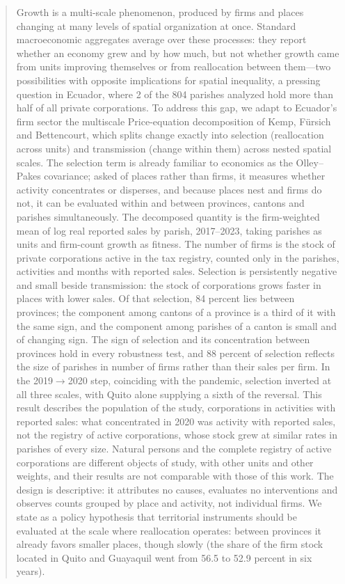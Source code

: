 \documentclass[conference]{IEEEtran}
\begin{document}
\begin{abstract}
Growth is a multi-scale phenomenon, produced by firms and places changing
at many levels of spatial organization at once. Standard macroeconomic
aggregates average over these processes: they report whether an economy
grew and by how much, but not whether growth came from units improving
themselves or from reallocation between them---two possibilities with
opposite implications for spatial inequality, a pressing question in
Ecuador, where 2 of the 804 parishes analyzed hold more than half of all
private corporations. To address this gap, we adapt to Ecuador's firm
sector the multiscale Price-equation decomposition of Kemp, F\"ursich and
Bettencourt, which splits change exactly into selection (reallocation
across units) and transmission (change within them) across nested spatial
scales. The selection term is already familiar to economics as the
Olley--Pakes covariance; asked of places rather than firms, it measures
whether activity concentrates or disperses, and because places nest and
firms do not, it can be evaluated within and between provinces, cantons
and parishes simultaneously. The decomposed quantity is the firm-weighted
mean of log real reported sales by parish, 2017--2023, taking parishes as
units and firm-count growth as fitness. The number of firms is the stock
of private corporations active in the tax registry, counted only in the
parishes, activities and months with reported sales. Selection is
persistently negative and small beside transmission: the stock of
corporations grows faster in places with lower sales. Of that selection,
84 percent lies between provinces; the component among cantons of a
province is a third of it with the same sign, and the component among
parishes of a canton is small and of changing sign. The sign of selection
and its concentration between provinces hold in every robustness test, and 88 percent of selection reflects the size of parishes in
number of firms rather than their sales per firm. In the 2019$\to$2020
step, coinciding with the pandemic, selection inverted at all three
scales, with Quito alone supplying a sixth of the reversal. This result describes
the population of the study, corporations in activities with reported
sales: what concentrated in 2020 was activity with reported sales, not the
registry of active corporations, whose stock grew at similar rates in
parishes of every size. Natural persons and the complete registry of
active corporations are different objects of study, with other units and
other weights, and their results are not comparable with those of this
work. The design is descriptive: it attributes no
causes, evaluates no interventions and observes counts grouped by place
and activity, not individual firms. We state as a policy hypothesis that
territorial instruments should be evaluated at the scale where
reallocation operates: between provinces it already favors smaller
places, though slowly (the share of the firm stock located in Quito and
Guayaquil went from 56.5 to 52.9 percent in six years).
\end{abstract}
\end{document}
